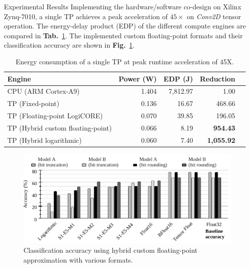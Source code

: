 \documentclass[final]{beamer}
\newlength{\onecolwid}
\newlength{\twocolwid}
\newcommand\fig[1]{\textbf{Fig.}~\ref{#1}}
\newcommand\tab[1]{\textbf{Tab.}~\ref{#1}}
\begin{document}
\begin{frame}[t]
\begin{columns}[t]
\begin{column}{\twocolwid}
\begin{columns}[t,totalwidth=\twocolwid]
\begin{column}{\onecolwid}
\begin{block}{Experimental Results}
	Implementing the hardware/software co-design on Xilinx Zynq-7010, a single TP achieves a peak acceleration of $45\times$ on \emph{Conv2D} tensor operation. The energy-delay product (EDP) of the different compute engines are compared in \tab{tab:energy}. The implemented custom floating-point formats and their classification accuracy are shown in \fig{fig:accuracy}.
	\begin{table}[!htp]\centering
		\caption{Energy consumption of a single TP at peak runtime acceleration of 45X.}\label{tab:energy}
		\scriptsize
		\begin{tabular}{lrrrr}\toprule
			Engine &Power (W) &EDP (J) &Reduction \\\midrule
			CPU (ARM Cortex-A9)&1.404 &7,812.97 &1.00 \\
			TP (Fixed-point) &0.136 &16.67 &468.66 \\
			TP (Floating-point LogiCORE) &0.070 &39.85 &196.05 \\
			TP (Hybrid custom floating-point) &0.066 &8.19 &\textbf{954.43} \\
			TP (Hybrid logarithmic) &0.060 &7.40 &\textbf{1,055.92} \\
			\bottomrule
		\end{tabular}
	\end{table}
	
	\begin{figure}
		\includegraphics[width=\linewidth]{../figures/all_models_accuracy.pdf}
		\caption{Classification accuracy using hybrid custom floating-point approximation with various formats.}
		\label{fig:accuracy}
	\end{figure}
\end{block}


\end{column} %


\end{columns}
\end{column}
\end{columns}
\end{frame}
\end{document}
